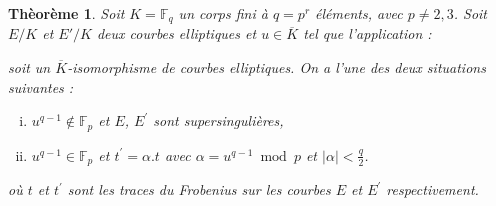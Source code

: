 \documentclass[a4paper]{article} %
\numberwithin{equation}{section}
\newcommand\GF[1]{\mathbb{F}_{#1}}
\begin{document}
\newtheorem{thm}{Thèorème}[section]
\newtheorem{lem}[thm]{Lemme}
\newtheorem{cor}{Corollaire}[thm]
\newtheorem{prop}[thm]{Proposition}
\theoremstyle{definition}
\newtheorem{defn}[thm]{Définition}
\newtheorem*{ex}{Exemple}
\theoremstyle{remark}
\newtheorem{rem}{Remarque}[thm]

\begin{thm}Soit $K = \GF{q}$ un corps fini à $q = p^r$ éléments, avec $p\neq2,3$. Soit $E/K$ et $E'/K$ deux courbes elliptiques et $u\in\overline{K}$ tel que l'application :

\begin{center}
\end{center}
soit un $\overline{K}$-isomorphisme de courbes elliptiques. On a l'une des deux situations suivantes :

\begin{enumerate}[i)]
    \item $u^{q-1}\not\in \GF{p}$ et $E$, $E^{\prime}$ sont supersingulières,
    \item $u^{q-1}\in \GF{p}$ et $t^{\prime} = \alpha.t$ avec $\alpha = u^{q-1} \bmod p$ et $|\alpha| < \tfrac{q}{2}$.
\end{enumerate}
où $t$ et $t^{\prime}$ sont les traces du Frobenius sur les courbes $E$ et $E^{\prime}$ respectivement.
\end{thm}
\end{document}
